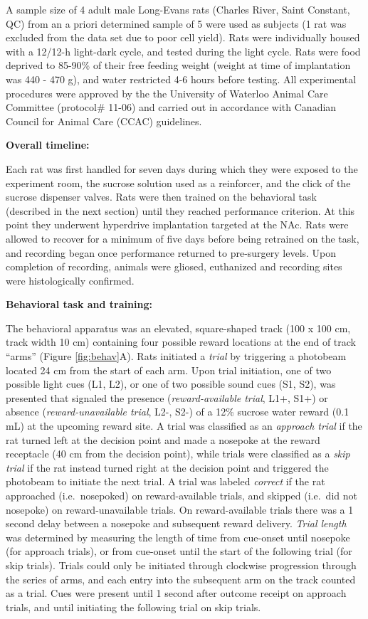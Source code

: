 \documentclass[11pt]{article}
\begin{document}
A sample size of 4 adult male Long-Evans rats (Charles River, Saint
Constant, QC) from an a priori determined sample of 5 were used as
subjects (1 rat was excluded from the data set due to poor cell
yield). Rats were individually housed with a 12/12-h light-dark cycle,
and tested during the light cycle. Rats were food deprived to 85-90\%
of their free feeding weight (weight at time of implantation was 440 -
470 g), and water restricted 4-6 hours before testing. All
experimental procedures were approved by the the University of
Waterloo Animal Care Committee (protocol\# 11-06) and carried out in
accordance with Canadian Council for Animal Care (CCAC) guidelines.

{\bf Overall timeline:}

Each rat was first handled for seven days during which they were
exposed to the experiment room, the sucrose solution used as a
reinforcer, and the click of the sucrose dispenser valves. Rats were
then trained on the behavioral task (described in the next section)
until they reached performance criterion. At this point they
underwent hyperdrive implantation targeted at the NAc. Rats were
allowed to recover for a minimum of five days before being retrained
on the task, and recording began once performance returned to
pre-surgery levels. Upon completion of recording, animals were gliosed,
euthanized and recording sites were histologically confirmed.

{\bf Behavioral task and training:}

The behavioral apparatus was an elevated, square-shaped track (100 x
100 cm, track width 10 cm) containing four possible reward locations
at the end of track ``arms'' (Figure \ref{fig:behav}A). Rats initiated a
{\it trial} by triggering a photobeam located 24 cm from the start of
each arm. Upon trial initiation, one of two possible light cues (L1,
L2), or one of two possible sound cues (S1, S2), was presented that
signaled the presence ({\it reward-available trial}, L1+, S1+) or
absence ({\it reward-unavailable trial}, L2-, S2-) of a 12\% sucrose
water reward (0.1 mL) at the upcoming reward site. A trial was
classified as an {\it approach trial} if the rat turned left at the
decision point and made a nosepoke at the reward receptacle (40 cm
from the decision point), while trials were classified as a {\it skip
trial} if the rat instead turned right at the decision point and
triggered the photobeam to initiate the next trial. A trial was labeled
{\it correct} if the rat approached (i.e.\ nosepoked) on
reward-available trials, and skipped (i.e.\ did not nosepoke) on
reward-unavailable trials. On reward-available trials there was a 1
second delay between a nosepoke and subsequent reward delivery. {\it
Trial length} was determined by measuring the length of time from
cue-onset until nosepoke (for approach trials), or from cue-onset
until the start of the following trial (for skip trials). Trials could
only be initiated through clockwise progression through the series of
arms, and each entry into the subsequent arm on the track counted as a
trial. Cues were present until 1  second after outcome receipt on approach trials, and until initiating the following trial on skip trials.
\end{document}
